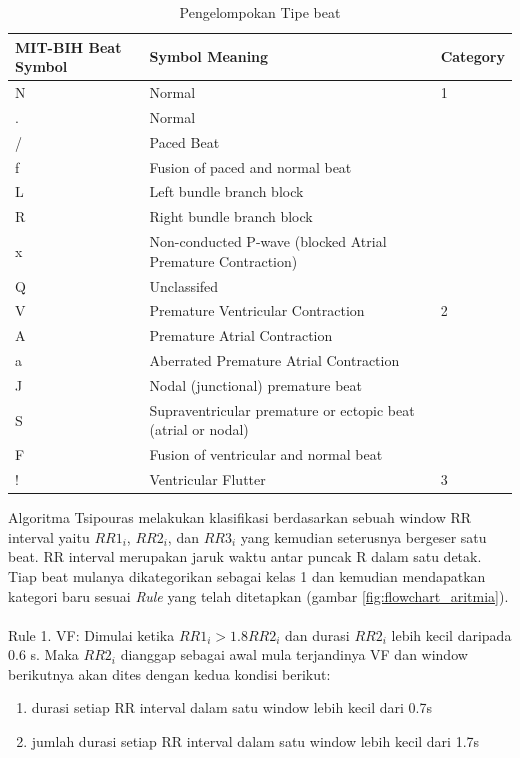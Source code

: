 \begin{table}[H]
\centering
	\begin{tabular}{|L{2cm}|L{8.5cm}|C{2cm}|}
	\hline
	\textbf{MIT-BIH Beat Symbol} & \textbf{Symbol Meaning} & 	\textbf{Category} \\
	\hline
	N & Normal & 1 \\
	. & Normal &  \\
	/ & Paced Beat & \\ 
	f & Fusion of paced and normal beat & \\
	L & Left bundle branch block & \\ 
	R & Right bundle branch block & \\ 
	x & Non-conducted P-wave (blocked Atrial Premature Contraction) & \\
	Q & Unclassifed & \\
	\hline
	V & Premature Ventricular Contraction & 2 \\
	A & Premature Atrial Contraction & \\
	a & Aberrated Premature Atrial Contraction & \\
	J & Nodal (junctional) premature beat & \\
	S & Supraventricular premature or ectopic beat (atrial or nodal) & \\
	F & Fusion of ventricular and normal beat & \\	
	\hline
	! & Ventricular Flutter & 3 \\
	\hline
	\end{tabular}
	\caption{Pengelompokan Tipe beat}
	\label{table:beat_classification}
\end{table}

Algoritma Tsipouras melakukan klasifikasi berdasarkan sebuah window RR interval yaitu $RR1_i$, $RR2_i$, dan $RR3_i$ yang kemudian seterusnya bergeser satu beat. RR interval merupakan jaruk waktu antar puncak R dalam satu detak. Tiap beat mulanya dikategorikan sebagai kelas 1 dan kemudian mendapatkan kategori baru sesuai \textit{Rule} yang telah ditetapkan (gambar \ref{fig:flowchart_aritmia}).
\\
\\
Rule 1. VF: Dimulai ketika $RR1_i > 1.8RR2_i$ dan durasi $RR2_i$ lebih kecil daripada 0.6 s. Maka $RR2_i$ dianggap sebagai awal mula terjandinya VF dan window berikutnya akan dites dengan kedua kondisi berikut:

\begin{enumerate}
	\item durasi setiap RR interval dalam satu window lebih kecil dari 0.7s
	\item jumlah durasi setiap RR interval dalam satu window lebih kecil dari 1.7s
\end{enumerate}


